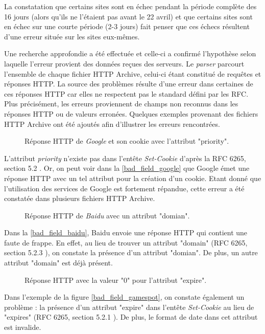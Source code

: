 La constatation que certains sites sont en échec pendant la période complète des 16 jours (alors qu'ils ne l'étaient pas avant le 22 avril) et que certains sites sont en échec sur une courte période (2-3 jours) fait penser que ces échecs résultent d'une erreur située sur les sites eux-mêmes.

Une recherche approfondie a été effectuée et celle-ci a confirmé l'hypothèse selon laquelle l'erreur provient des données reçues des serveurs. Le \textit{parser} parcourt l'ensemble de chaque fichier HTTP Archive, celui-ci étant constitué de requêtes et réponses HTTP. La source des problèmes résulte d'une erreur dans certaines de ces réponses HTTP car elles ne respectent pas le standard défini par les RFC.
\\

Plus précisément, les erreurs proviennent de champs non reconnus dans les réponses HTTP ou de valeurs erronées.
Quelques exemples provenant des fichiers HTTP Archive ont été ajoutés afin d'illustrer les erreurs rencontrées.

\begin{figure}[h]
	\centering
	
	\caption{\label{bad_field_google}Réponse HTTP de \textit{Google} et son cookie avec l'attribut "priority".}
\end{figure}
L'attribut \textit{priority} n'existe pas dans l'entête \textit{Set-Cookie} d'après la RFC 6265, section 5.2 \cite{IETF_RFC6265}. Or, on peut voir dans la \autoref{bad_field_google} que Google émet une réponse HTTP avec un tel attribut pour la création d'un cookie. Etant donné que l'utilisation des services de Google est fortement répandue, cette erreur a été constatée dans plusieurs fichiers HTTP Archive.

\begin{figure}[h]
	\centering
	
	\caption{\label{bad_field_baidu}Réponse HTTP de \textit{Baidu} avec un attribut "domian".}
\end{figure}
Dans la \autoref{bad_field_baidu}, Baidu envoie une réponse HTTP qui contient une faute de frappe. En effet, au lieu de trouver un attribut "domain" (RFC 6265, section 5.2.3 \cite{IETF_RFC6265}), on constate la présence d'un attribut "domian". De plus, un autre attribut "domain" est déjà présent.
\newline

\begin{figure}[h]
	\centering
	
	\caption{\label{bad_field_gamespot}Réponse HTTP avec la valeur "0" pour l'attribut "expire".}
\end{figure}
Dans l'exemple de la figure \autoref{bad_field_gamespot}, on constate également un problème : la présence d'un attribut "expire" dans l'entête \textit{Set-Cookie} au lieu de "expires" (RFC 6265, section 5.2.1 \cite{IETF_RFC6265}). De plus, le format de date dans cet attribut est invalide.
\newline

